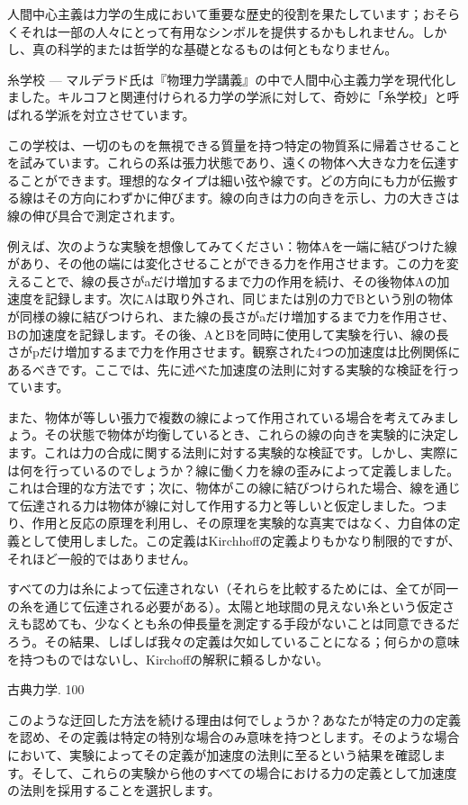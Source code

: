 \documentclass[a4paper,11pt,openany]{ltjsbook}
\begin{document}
人間中心主義は力学の生成において重要な歴史的役割を果たしています；おそらくそれは一部の人々にとって有用なシンボルを提供するかもしれません。しかし、真の科学的または哲学的な基礎となるものは何ともなりません。

糸学校 — マルデラド氏は『物理力学講義』の中で人間中心主義力学を現代化しました。キルコフと関連付けられる力学の学派に対して、奇妙に「糸学校」と呼ばれる学派を対立させています。

この学校は、一切のものを無視できる質量を持つ特定の物質系に帰着させることを試みています。これらの系は張力状態であり、遠くの物体へ大きな力を伝達することができます。理想的なタイプは細い弦や線です。どの方向にも力が伝搬する線はその方向にわずかに伸びます。線の向きは力の向きを示し、力の大きさは線の伸び具合で測定されます。

例えば、次のような実験を想像してみてください：物体Aを一端に結びつけた線があり、その他の端には変化させることができる力を作用させます。この力を変えることで、線の長さがaだけ増加するまで力の作用を続け、その後物体Aの加速度を記録します。次にAは取り外され、同じまたは別の力でBという別の物体が同様の線に結びつけられ、また線の長さがaだけ増加するまで力を作用させ、Bの加速度を記録します。その後、AとBを同時に使用して実験を行い、線の長さがpだけ増加するまで力を作用させます。観察された4つの加速度は比例関係にあるべきです。ここでは、先に述べた加速度の法則に対する実験的な検証を行っています。

また、物体が等しい張力で複数の線によって作用されている場合を考えてみましょう。その状態で物体が均衡しているとき、これらの線の向きを実験的に決定します。これは力の合成に関する法則に対する実験的な検証です。しかし、実際には何を行っているのでしょうか？線に働く力を線の歪みによって定義しました。これは合理的な方法です；次に、物体がこの線に結びつけられた場合、線を通じて伝達される力は物体が線に対して作用する力と等しいと仮定しました。つまり、作用と反応の原理を利用し、その原理を実験的な真実ではなく、力自体の定義として使用しました。この定義はKirchhoffの定義よりもかなり制限的ですが、それほど一般的ではありません。

すべての力は糸によって伝達されない（それらを比較するためには、全てが同一の糸を通じて伝達される必要がある）。太陽と地球間の見えない糸という仮定さえも認めても、少なくとも糸の伸長量を測定する手段がないことは同意できるだろう。その結果、しばしば我々の定義は欠如していることになる；何らかの意味を持つものではないし、Kirchoffの解釈に頼るしかない。

古典力学. 100

このような迂回した方法を続ける理由は何でしょうか？あなたが特定の力の定義を認め、その定義は特定の特別な場合のみ意味を持つとします。そのような場合において、実験によってその定義が加速度の法則に至るという結果を確認します。そして、これらの実験から他のすべての場合における力の定義として加速度の法則を採用することを選択します。
\end{document}
